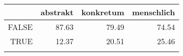 \begin{tabular}{rrrr}
  \lsptoprule
 & abstrakt & konkretum & menschlich \\ 
  \midrule
FALSE & 87.63 & 79.49 & 74.54 \\ 
  TRUE & 12.37 & 20.51 & 25.46 \\ 
   \lspbottomrule
\end{tabular}
